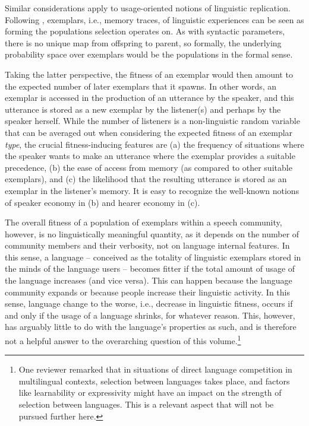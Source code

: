 \documentclass[output=paper,hidelinks]{langscibook}
\begin{document}
Similar considerations apply to usage-oriented notions of linguistic
replication. Following \citet{bybee06}, exemplars, i.e., memory traces, of linguistic
experiences can be seen as forming the populations selection operates on. As with
syntactic parameters, there is no unique map from offspring to parent, so formally, the
underlying probability space over exemplars would be the populations in the formal sense.

Taking the latter perspective, the fitness of an exemplar would then amount to the
expected number of later exemplars that it spawns. In other words, an exemplar is accessed
in the production of an utterance by the speaker, and this utterance is stored as a new
exemplar by the listener(s) and perhaps by the speaker herself. While the number of
listeners is a non-linguistic random variable that can be averaged out when considering
the expected fitness of an exemplar \emph{type}, the crucial fitness-inducing features are
(a) the frequency of situations where the speaker wants to make an utterance where the
exemplar provides a suitable precedence, (b) the ease of access from memory (as compared
to other suitable exemplars), and (c) the likelihood that the resulting utterance is
stored as an exemplar in the listener's memory. It is easy to recognize the well-known
notions of speaker economy in (b) and hearer economy in (c).

The overall fitness of a population of exemplars within a speech community, however, is no
linguistically meaningful quantity, as it depends on the number of community members and
their verbosity, not on language internal features. In this sense, a language --
conceived as the totality of linguistic exemplars stored in the minds of the language users -- becomes fitter if the total amount of usage of the language increases (and vice
versa). This can happen because the language community expands or because people increase
their linguistic activity. In this sense, language change to the worse, i.e., decrease in
linguistic fitness, occurs if and only if the usage of a language shrinks, for whatever
reason. This, however, has arguably little to do with the language's properties as such,
and is therefore not a helpful answer to the overarching question of this
volume.\footnote{One reviewer remarked that in situations of direct language competition
  in multilingual contexts, selection between languages takes place, and factors like
  learnability or expressivity might have an impact on the strength of selection between
  languages. This is a relevant aspect that will not be pursued further here.}
\end{document}
